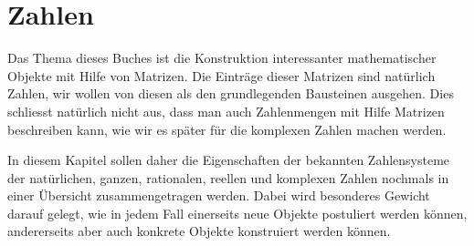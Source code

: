 %
%
%
\chapter{Zahlen
\label{buch:chapter:zahlen}}
\rhead{}

Das Thema dieses Buches ist die Konstruktion interessanter 
mathematischer Objekte mit Hilfe von Matrizen.
Die Einträge dieser Matrizen sind natürlich Zahlen, wir wollen
von diesen als den grundlegenden Bausteinen ausgehen.
Dies schliesst natürlich nicht aus, dass man auch Zahlenmengen
mit Hilfe Matrizen beschreiben kann, wie wir es später für die
komplexen Zahlen machen werden.

In diesem Kapitel sollen daher die Eigenschaften der bekannten
Zahlensysteme der natürlichen, ganzen, rationalen, reellen und
komplexen Zahlen nochmals in einer Übersicht zusammengetragen
werden.
Dabei wird besonderes Gewicht darauf gelegt, wie in jedem Fall
einerseits neue Objekte postuliert werden können, andererseits
aber auch konkrete Objekte konstruiert werden können.








